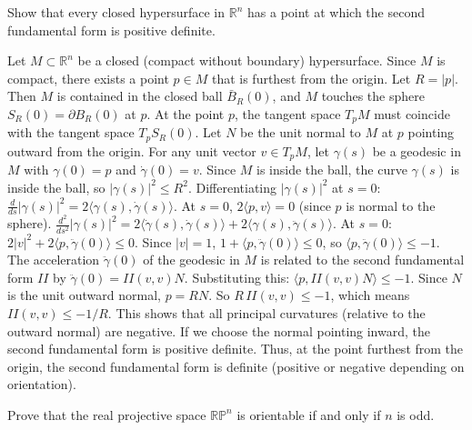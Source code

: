 \begin{exercise}
\label{geometry:2010:2}
Show that every closed hypersurface in $\mathbb{R}^{n}$ has a point at which the second fundamental form is positive definite.
\end{exercise}

\begin{solution}
Let $M \subset \mathbb{R}^n$ be a closed (compact without boundary) hypersurface.
Since $M$ is compact, there exists a point $p \in M$ that is furthest from the origin.
Let $R = |p|$. Then $M$ is contained in the closed ball $\bar{B}_R(0)$, and $M$ touches the sphere $S_R(0) = \partial B_R(0)$ at $p$.
At the point $p$, the tangent space $T_p M$ must coincide with the tangent space $T_p S_R(0)$.
Let $N$ be the unit normal to $M$ at $p$ pointing outward from the origin.
For any unit vector $v \in T_p M$, let $\gamma(s)$ be a geodesic in $M$ with $\gamma(0) = p$ and $\dot{\gamma}(0) = v$.
Since $M$ is inside the ball, the curve $\gamma(s)$ is inside the ball, so $|\gamma(s)|^2 \leq R^2$.
Differentiating $|\gamma(s)|^2$ at $s=0$:
$\frac{d}{ds} |\gamma(s)|^2 = 2 \langle \gamma(s), \dot{\gamma}(s) \rangle$. At $s=0$, $2 \langle p, v \rangle = 0$ (since $p$ is normal to the sphere).
$\frac{d^2}{ds^2} |\gamma(s)|^2 = 2 \langle \dot{\gamma}(s), \dot{\gamma}(s) \rangle + 2 \langle \gamma(s), \ddot{\gamma}(s) \rangle$.
At $s=0$: $2|v|^2 + 2 \langle p, \ddot{\gamma}(0) \rangle \leq 0$.
Since $|v|=1$, $1 + \langle p, \ddot{\gamma}(0) \rangle \leq 0$, so $\langle p, \ddot{\gamma}(0) \rangle \leq -1$.
The acceleration $\ddot{\gamma}(0)$ of the geodesic in $M$ is related to the second fundamental form $II$ by $\ddot{\gamma}(0) = II(v, v) N$.
Substituting this: $\langle p, II(v, v) N \rangle \leq -1$.
Since $N$ is the unit outward normal, $p = RN$.
So $R \, II(v, v) \leq -1$, which means $II(v, v) \leq -1/R$.
This shows that all principal curvatures (relative to the outward normal) are negative.
If we choose the normal pointing inward, the second fundamental form is positive definite.
Thus, at the point furthest from the origin, the second fundamental form is definite (positive or negative depending on orientation).
\end{solution}

\begin{exercise}
\label{geometry:2010:3}
Prove that the real projective space $\mathbb{RP}^{n}$ is orientable if and only if $n$ is odd.
\end{exercise}

